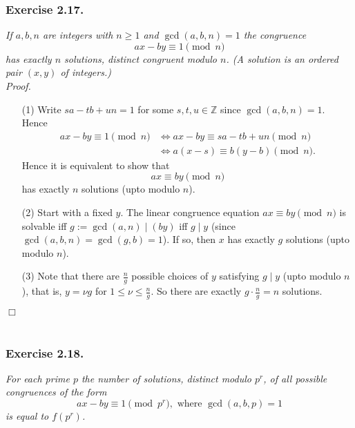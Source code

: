 \documentclass{article}
\begin{document}



\subsubsection*{Exercise 2.17.}
\emph{If $a, b, n$ are integers with $n \geq 1$ and $\gcd(a,b,n) = 1$ the congruence
\[
  ax - by \equiv 1 \pmod{n}
\]
has exactly $n$ solutions, distinct congruent modulo $n$.
(A solution is an ordered pair $(x,y)$ of integers.)} \\



\emph{Proof.}
\begin{enumerate}
\item[(1)]
  Write $sa - tb + un = 1$ for some $s, t, u \in \mathbb{Z}$ since $\gcd(a,b,n) = 1$.
  Hence
  \begin{align*}
    ax - by \equiv 1 \pmod{n}
    &\Longleftrightarrow
    ax - by \equiv sa - tb + un \pmod{n} \\
    &\Longleftrightarrow
    a(x-s) \equiv b(y-b) \pmod{n}.
  \end{align*}
  Hence it is equivalent to show that
  \[
    ax \equiv by \pmod{n}
  \]
  has exactly $n$ solutions (upto modulo $n$).

\item[(2)]
  Start with a fixed $y$.
  The linear congruence equation $ax \equiv by \pmod{n}$ is solvable iff
  $g := \gcd(a,n) \mid (by)$ iff
  $g \mid y$ (since $\gcd(a,b,n) = \gcd(g,b) = 1$).
  If so, then $x$ has exactly $g$ solutions (upto modulo $n$).

\item[(3)]
  Note that there are $\frac{n}{g}$ possible choices of $y$ satisfying $g \mid y$ (upto modulo $n$),
  that is, $y = \nu g$ for $1 \leq \nu \leq \frac{n}{g}$.
  So there are exactly $g \cdot \frac{n}{g} = n$ solutions.
\end{enumerate}
$\Box$ \\\\






\subsubsection*{Exercise 2.18.}
\emph{For each prime $p$ the number of solutions,
distinct modulo $p^r$,
of all possible congruences of the form
\[
  ax - by \equiv 1 \pmod{p^r}, \text{ where } \gcd(a,b,p) = 1
\]
is equal to $f(p^r)$.} \\
\end{document}
